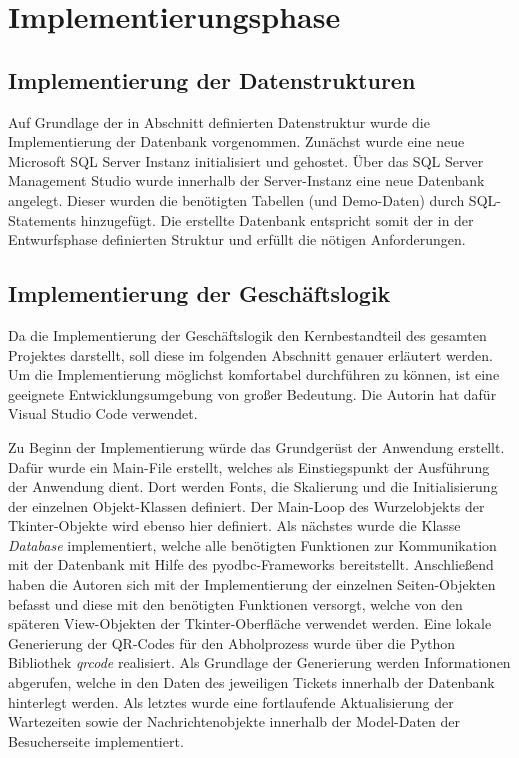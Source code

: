 \section{Implementierungsphase} 
\label{sec:Implementierungsphase}

\subsection{Implementierung der Datenstrukturen}
\label{sec:ImplementierungDatenstrukturen}
Auf Grundlage der in Abschnitt  definierten Datenstruktur wurde die Implementierung der Datenbank vorgenommen. Zunächst wurde eine
neue Microsoft SQL Server Instanz initialisiert und gehostet. Über das SQL Server Management Studio wurde innerhalb der Server-Instanz eine neue Datenbank angelegt. 
Dieser wurden die benötigten Tabellen (und Demo-Daten) durch \acs{SQL}-Statements hinzugefügt. Die erstellte Datenbank entspricht somit der in der Entwurfsphase definierten
Struktur und erfüllt die nötigen Anforderungen.

\subsection{Implementierung der Geschäftslogik}
\label{sec:ImplementierungGeschaeftslogik}
Da die Implementierung der Geschäftslogik den Kernbestandteil des gesamten Projektes darstellt, soll diese im folgenden Abschnitt genauer erläutert werden. Um die
Implementierung möglichst komfortabel durchführen zu können, ist eine geeignete Entwicklungsumgebung von großer Bedeutung. Die Autorin hat dafür Visual Studio
Code verwendet.

Zu Beginn der Implementierung würde das Grundgerüst der Anwendung erstellt. Dafür wurde ein Main-File erstellt, welches als Einstiegspunkt der Ausführung der Anwendung dient.
Dort werden Fonts, die Skalierung und die Initialisierung der einzelnen Objekt-Klassen definiert. Der Main-Loop des Wurzelobjekts der Tkinter-Objekte wird ebenso hier definiert.
Als nächstes wurde die Klasse \emph{Database} implementiert, welche alle benötigten Funktionen zur Kommunikation mit der Datenbank mit Hilfe des pyodbc-Frameworks bereitstellt.
Anschließend haben die Autoren sich mit der Implementierung der einzelnen Seiten-Objekten befasst und diese mit den benötigten Funktionen versorgt, welche von den späteren
View-Objekten der Tkinter-Oberfläche verwendet werden. Eine lokale Generierung der \acs{QR}-Codes für den Abholprozess wurde über die Python Bibliothek \emph{qrcode} realisiert. Als
Grundlage der Generierung werden Informationen abgerufen, welche in den Daten des jeweiligen Tickets innerhalb der Datenbank hinterlegt werden. Als letztes wurde eine fortlaufende
Aktualisierung der Wartezeiten sowie der Nachrichtenobjekte innerhalb der Model-Daten der Besucherseite implementiert.

